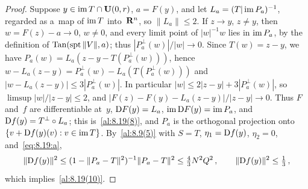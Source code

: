 \begin{proof}
    Suppose $y \in \operatorname{im} T \cap \mathbf{U}(0,r)$, $a = F(y)$, and let $L_a = (T | \operatorname{im} P_a)^{-1}$,
    regarded as a~map of $\operatorname{im} T$ into~$\mathbf{R}^{n}$, so $\|L_a\| \le 2$. If $z \to y$, $z \ne y$, then
    $w = F(z) - a \to 0$, $w \ne 0$, and every limit point of $|w|^{-1} w$ lies in $\operatorname{im} P_a$, by the
    definition of $\operatorname{Tan}(\operatorname{spt} \|V\|, a)$; thus $|P_a^\perp(w)| / |w| \to 0$. Since $T(w) = z - y$, we
    have $P_a(w) = L_a(z - y - T(P_a^\perp(w)))$, hence $w - L_a(z - y) = P_a^\perp(w) - L_a(T(P_a^\perp
    (w)))$ and $|w - L_a(z - y)| \le 3 |P_a^\perp(w)|$. In particular $|w| \le 2 |z - y| + 3
    |P_a^\perp(w)|$, so $\limsup |w|/|z - y| \le 2$, and $|F(z) - F(y) - L_a(z - y)| / |z - y| \to
    0$. Thus $F$ and~$f$ are differentiable at~$y$, $\mathrm{D} F(y) = L_a$, $\operatorname{im} \mathrm{D} F(y) = \operatorname{im} P_a$, and
    $\mathrm{D} f(y) = T^\perp \circ L_a$; this is~\ref{al:8.19(8)}, and $P_a$ is the orthogonal projection
    onto $\{ v + \mathrm{D} f(y)(v) : v \in \operatorname{im} T \}$. By~\ref{al:8.9(5)} with $S = T$, $\eta_1 = \mathrm{D}
    f(y)$, $\eta_2 = 0$, and~\eqref{eq:8.19:a},
    \begin{equation}
        \label{eq:8.19:b}
        \|\mathrm{D} f(y)\|^2 \le (1 - \|P_a - T\|^2)^{-1} \|P_a - T\|^2 \le \tfrac43 N^2 Q^2 \,, \qquad
        \|\mathrm{D} f(y)\|^2 \le \tfrac13 \,,
    \end{equation}
    which implies~\ref{al:8.19(10)}.


\end{proof}
